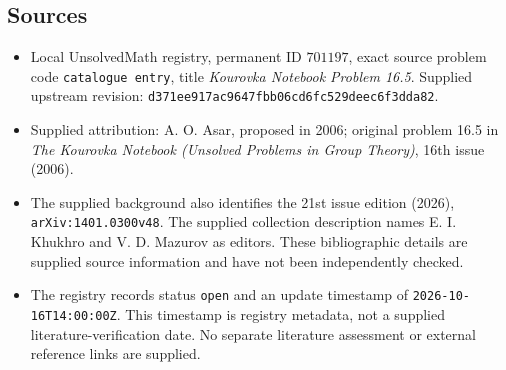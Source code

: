 \documentclass[11pt]{article}
\begin{document}
\subsection{Sources}
\begin{itemize}
\item Local UnsolvedMath registry, permanent ID \(701197\), exact source problem code \texttt{catalogue entry}, title \emph{Kourovka Notebook Problem 16.5}. Supplied upstream revision: \texttt{d371ee917ac9647fbb06cd6fc529deec6f3dda82}.
\item Supplied attribution: A. O. Asar, proposed in 2006; original problem 16.5 in \emph{The Kourovka Notebook (Unsolved Problems in Group Theory)}, 16th issue (2006).
\item The supplied background also identifies the 21st issue edition (2026), \texttt{arXiv:1401.0300v48}. The supplied collection description names E. I. Khukhro and V. D. Mazurov as editors. These bibliographic details are supplied source information and have not been independently checked.
\item The registry records status \texttt{open} and an update timestamp of \texttt{2026-10-16T14:00:00Z}. This timestamp is registry metadata, not a supplied literature-verification date. No separate literature assessment or external reference links are supplied.
\end{itemize}
\end{document}

